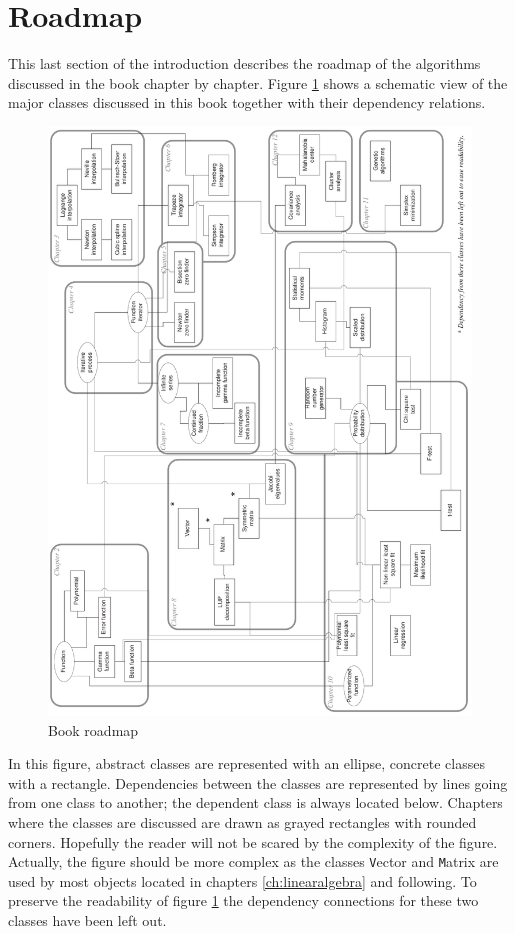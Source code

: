 \section{Roadmap}
This last section of the introduction describes the roadmap of
the algorithms discussed in the book chapter by chapter. Figure
\ref{fig:roadmap} shows a schematic view of the major classes
discussed in this book together with their dependency relations.
\begin{figure}
\centering\includegraphics[width=13cm]{Figures/Roadmap}
\caption{Book roadmap} \label{fig:roadmap}
\end{figure}
In this figure, abstract classes are represented with an ellipse,
concrete classes with a rectangle. Dependencies between the
classes are represented by lines going from one class to another;
the dependent class is always located below. Chapters where the
classes are discussed are drawn as grayed rectangles with rounded
corners. Hopefully the reader will not be scared by the complexity
of the figure. Actually, the figure should be more complex as the
classes {\texttt Vector} and {\texttt Matrix} are used by most objects
located in chapters \ref{ch:linearalgebra} and following. To
preserve the readability of figure \ref{fig:roadmap} the
dependency connections for these two classes have been left out.

